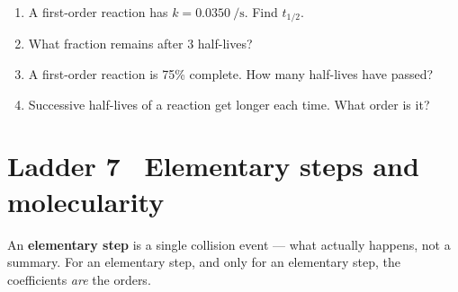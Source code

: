 \documentclass{apchem-worksheet}
\begin{document}
\begin{yourturn}
\begin{enumerate}[leftmargin=*,itemsep=0.5em]
  \item A first-order reaction has $k = \SI{0.0350}{\per\second}$. Find
        $t_{1/2}$. \workspace[1.6cm]
  \item What fraction remains after 3 half-lives?
        \workspace[1.4cm]
  \item A first-order reaction is 75\% complete. How many half-lives
        have passed? \workspace[1.6cm]
  \item Successive half-lives of a reaction get longer each time. What
        order is it? \workspace[1.6cm]
\end{enumerate}
\end{yourturn}

\section*{\sffamily Ladder 7 \textbullet\ Elementary steps and
molecularity}

An \textbf{elementary step} is a single collision event --- what
actually happens, not a summary. For an elementary step, and only for an
elementary step, the coefficients \emph{are} the orders.
\end{document}

